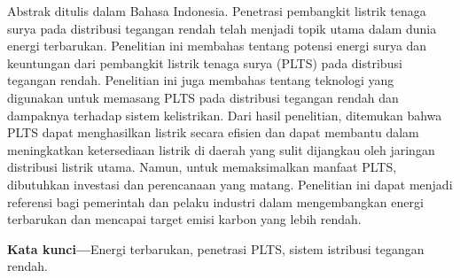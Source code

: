 {
Abstrak ditulis dalam Bahasa Indonesia. Penetrasi pembangkit listrik tenaga surya pada distribusi tegangan rendah telah menjadi topik utama dalam dunia energi terbarukan. Penelitian ini membahas tentang potensi energi surya dan keuntungan dari pembangkit listrik tenaga surya (PLTS) pada distribusi tegangan rendah. Penelitian ini juga membahas tentang teknologi yang digunakan untuk memasang PLTS pada distribusi tegangan rendah dan dampaknya terhadap sistem kelistrikan. Dari hasil penelitian, ditemukan bahwa PLTS dapat menghasilkan listrik secara efisien dan dapat membantu dalam meningkatkan ketersediaan listrik di daerah yang sulit dijangkau oleh jaringan distribusi listrik utama. Namun, untuk memaksimalkan manfaat PLTS, dibutuhkan investasi dan perencanaan yang matang. Penelitian ini dapat menjadi referensi bagi pemerintah dan pelaku industri dalam mengembangkan energi terbarukan dan mencapai target emisi karbon yang lebih rendah.

\noindent\textbf{Kata kunci---}Energi terbarukan, penetrasi PLTS, sistem istribusi tegangan rendah.
}
